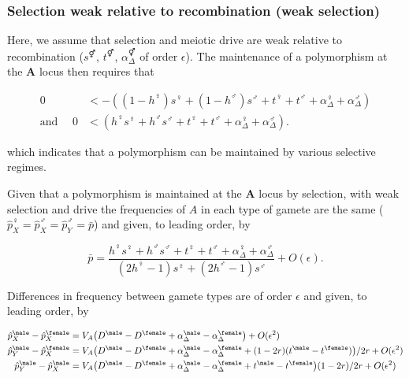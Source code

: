 \documentclass[12pt]{article}
\begin{document}
\subsubsection*{Selection weak relative to recombination (weak selection)}

Here, we assume that selection and meiotic drive are weak relative to recombination ($s^\Hermaphrodite$, $t^\Hermaphrodite$, $\alpha_{\Delta}^\Hermaphrodite$ of order $\epsilon$). 
The maintenance of a polymorphism at the \textbf{A} locus then requires that

\begin{equation}
\begin{split}
0&<-((1-h^\female)s^\female +(1-h^\male) s^\male + t^\female +t^\male + \alpha_{\Delta}^\female+\alpha_{\Delta}^\male)\\
%
\text{and }\quad 0&<(h^\female s^\female +h^\male s^\male + t^\female +t^\male + \alpha_{\Delta}^\female+\alpha_{\Delta}^\male).
\end{split}
\end{equation}

\noindent
which indicates that a polymorphism can be maintained by various selective regimes. 

Given that a polymorphism is maintained at the \textbf{A} locus by selection, with weak selection and drive the frequencies of $A$ in each type of gamete are the same ($\hat{p}^\female_X=\hat{p}^\male_X=\hat{p}^\male_Y=\bar{p}$) and given, to leading order, by 

\begin{equation}
\bar{p}=\frac{h^\female s^\female + h^\male s^\male +t^\female+t^\male+\alpha_{\Delta}^\female+\alpha_{\Delta}^\male}
{(2h^\female-1)s^\female+(2h^\male-1)s^\male}
+O(\epsilon)
.
\label{eq:pAve}
\end{equation}

\noindent
Differences in frequency between gamete types are of order $\epsilon$ and given, to leading order, by

\begin{equation}
\begin{split}
\hat{p}^\male_X-\hat{p}^\female_X&=V_{A}\big{(}D^\male - D^\female +\alpha_{\Delta}^\male-\alpha_{\Delta}^\female \big{)}
+O(\epsilon^2)\\
%
\hat{p}^\male_Y-\hat{p}^\female_X&=V_{A}\big{(}D^\male - D^\female+\alpha_{\Delta}^\male-\alpha_{\Delta}^\female+(1-2r)(t^\male-t^\female)\big{)}/2r
+O(\epsilon^2)\\
%
\hat{p}^\male_Y-\hat{p}^\male_X&=V_{A}\big{(}D^\male - D^\female+\alpha_{\Delta}^\male-\alpha_{\Delta}^\female+t^\male-t^\female\big{)}(1-2r)/2r
+O(\epsilon^2)
\end{split}
\label{eq:freq_diffs}
\end{equation}
\end{document}
